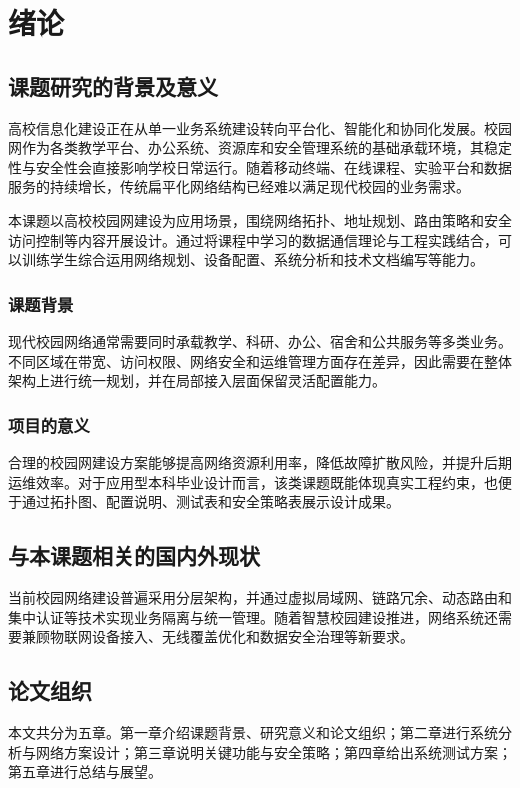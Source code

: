 \chapter{绪论}

\section{课题研究的背景及意义}

高校信息化建设正在从单一业务系统建设转向平台化、智能化和协同化发展。校园网作为各类教学平台、办公系统、资源库和安全管理系统的基础承载环境，其稳定性与安全性会直接影响学校日常运行。随着移动终端、在线课程、实验平台和数据服务的持续增长，传统扁平化网络结构已经难以满足现代校园的业务需求。

本课题以高校校园网建设为应用场景，围绕网络拓扑、地址规划、路由策略和安全访问控制等内容开展设计。通过将课程中学习的数据通信理论与工程实践结合，可以训练学生综合运用网络规划、设备配置、系统分析和技术文档编写等能力。

\subsection{课题背景}

现代校园网络通常需要同时承载教学、科研、办公、宿舍和公共服务等多类业务。不同区域在带宽、访问权限、网络安全和运维管理方面存在差异，因此需要在整体架构上进行统一规划，并在局部接入层面保留灵活配置能力。

\subsection{项目的意义}

合理的校园网建设方案能够提高网络资源利用率，降低故障扩散风险，并提升后期运维效率。对于应用型本科毕业设计而言，该类课题既能体现真实工程约束，也便于通过拓扑图、配置说明、测试表和安全策略表展示设计成果。

\section{与本课题相关的国内外现状}

当前校园网络建设普遍采用分层架构，并通过虚拟局域网、链路冗余、动态路由和集中认证等技术实现业务隔离与统一管理。随着智慧校园建设推进，网络系统还需要兼顾物联网设备接入、无线覆盖优化和数据安全治理等新要求。

\section{论文组织}

本文共分为五章。第一章介绍课题背景、研究意义和论文组织；第二章进行系统分析与网络方案设计；第三章说明关键功能与安全策略；第四章给出系统测试方案；第五章进行总结与展望。
